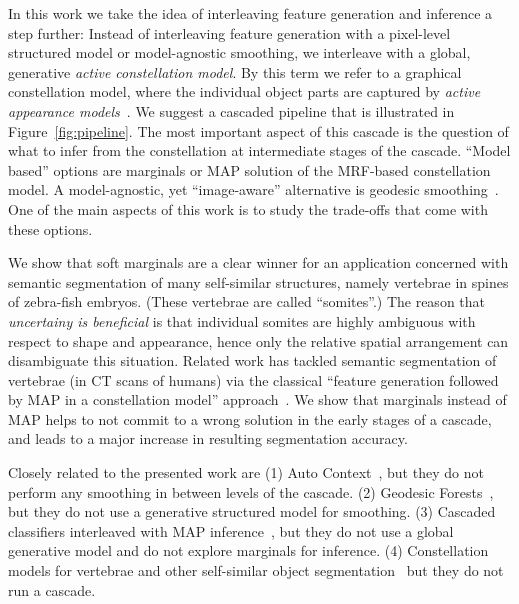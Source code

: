 \documentclass[10pt,twocolumn,letterpaper]{article}
\begin{document}
In this work we take the idea of interleaving feature generation and inference a step further: 
%
Instead of interleaving feature generation with a pixel-level structured model or model-agnostic smoothing, we interleave with a global, generative \emph{active constellation model}. By this term we refer to a graphical constellation model, where the individual object parts are captured by \emph{active appearance models}~\cite{CootesAAM2001}. 
%
We suggest a cascaded pipeline that is illustrated in Figure~\ref{fig:pipeline}. 
% 
The most important aspect of this cascade is the question of what to infer from the constellation at intermediate stages of the cascade. 
%
"`Model based"' options are marginals or MAP solution of the MRF-based constellation model. A model-agnostic, yet "`image-aware"' alternative is geodesic smoothing~\cite{GeoForests2013}. 
%
One of the main aspects of this work is to study the trade-offs that come with these options. 

We show that soft marginals are a clear winner for an application concerned with semantic segmentation of many self-similar structures, namely vertebrae in spines of zebra-fish embryos. 
%
(These vertebrae are called "`somites"'.) 
%
The reason that \emph{uncertainy is beneficial} is that individual somites are highly ambiguous with respect to shape and appearance, hence only the relative spatial arrangement can disambiguate this situation. 
%
Related work has tackled semantic segmentation of vertebrae (in CT scans of humans) via the classical "`feature generation followed by MAP in a constellation model"' approach~\cite{Glocker2013}.
%
We show that marginals instead of MAP helps to not commit to a wrong solution in the early stages of a cascade, and leads to a major increase in resulting segmentation accuracy. 

Closely related to the presented work are 
(1) Auto Context~\cite{AutoContext2008}, but they do not perform any smoothing in between levels of the cascade. 
(2) Geodesic Forests~\cite{GeoForests2013}, but they do not use a generative structured model for smoothing. 
(3) Cascaded classifiers interleaved with MAP inference~\cite{}, but they do not use a global generative model and do not explore marginals for inference. 
(4) Constellation models for vertebrae and other self-similar object segmentation~\cite{Glocker2012,Glocker2013,Klinder2009471,TeethMICCAI2012,WormMiccai2014} but they do not run a cascade. 
\end{document}

